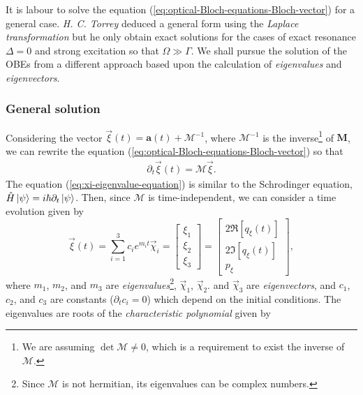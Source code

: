 It is labour to solve the equation (\ref{eq:optical-Bloch-equations-Bloch-vector}) for a general case. \textit{H. C. Torrey} \cite{torrey1949transient} deduced a general form using the \textit{Laplace transformation} but he only obtain exact solutions for the cases of exact resonance $ \Delta = 0 $ and strong excitation so that $ \Omega \gg \Gamma $. We shall pursue the solution of the OBEs from a different approach based upon the calculation of \textit{eigenvalues} and \textit{eigenvectors}.

\subsubsection{General solution}

Considering the vector $ \vec{\xi}(t) = \mathbf{a}(t) + \mathcal{M}^{-1} $, where $ \mathcal{M}^{-1} $ is the inverse\footnote{We are assuming $ \det\mathcal{M} \neq 0 $, which is a requirement to exist the inverse of $ \mathcal{M} $.} of $ \mathbf{M} $, we can rewrite the equation (\ref{eq:optical-Bloch-equations-Bloch-vector}) so that
\begin{gather}
	\partial_t \vec{\xi}(t) = \mathcal{M} \vec{\xi}.
	\label{eq:xi-eigenvalue-equation}
\end{gather}
The equation (\ref{eq:xi-eigenvalue-equation}) is similar to the Schrodinger equation, $ \hat{H}\ket{\psi} = i \hbar \partial_t \ket{\psi} $. Then, since $ \mathcal{M} $ is time-independent, we can consider a time evolution given by
\begin{equation}
	\vec{\xi}(t) = \sum_{i = 1}^{3} c_i e^{m_i t} \vec{\chi}_i = \left[ \begin{matrix} \xi_1 \\ \xi_2 \\ \xi_3 \end{matrix} \right] = \left[ \begin{matrix} 2\Re[q_{\xi}(t)] \\ 2\Im[q_{\xi}(t)] \\ p_{\xi} \end{matrix} \right],
	\label{eq:superposition-Bloch-vector-2}
\end{equation}
where $ m_1 $, $ m_2 $, and $ m_3 $ are \textit{eigenvalues}\footnote{Since $ \mathcal{M} $ is not hermitian, its eigenvalues can be complex numbers.}, $ \vec{\chi}_1 $, $ \vec{\chi}_2 $. and $ \vec{\chi}_3 $ are \textit{eigenvectors}, and $ c_1 $, $ c_2 $, and $ c_3 $ are constants ($ \partial_t c_i = 0 $) which depend on the initial conditions. The eigenvalues are roots of the \textit{characteristic polynomial} given by
